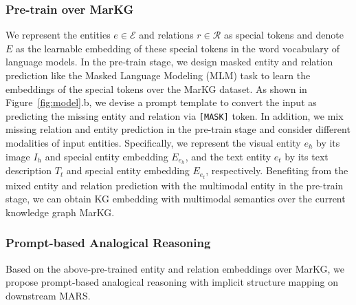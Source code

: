\documentclass{article} \usepackage{iclr2023_conference,times}
\newcommand{\data}{MARS}
\newcommand{\kg}{MarKG}
\begin{document}
\subsubsection{Pre-train over MarKG}
\label{sec:pre-train}
We represent the entities $e \in \mathcal{E}$ and relations $r \in \mathcal{R}$ as special tokens and denote $E$ as the learnable embedding of these special tokens in the word vocabulary of language models.
In the pre-train stage, we design masked entity and relation prediction like the Masked Language Modeling (MLM) task to learn the embeddings of the special tokens over the {\kg} dataset.
As shown in Figure~\ref{fig:model}.b, we devise a prompt template to convert the input as predicting the missing entity and relation via \texttt{[MASK]} token.
In addition, we mix missing relation and entity prediction in the pre-train stage and consider different modalities of input entities.
Specifically, we represent the visual entity $e_h$ by its image $I_h$ and special entity embedding $E_{e_h}$, and the text entity $e_t$ by its text description $T_t$ and special entity embedding  $E_{e_t}$, respectively. 
Benefiting from the mixed entity and relation prediction with the multimodal entity in the pre-train stage, we can obtain KG embedding with multimodal semantics over the current knowledge graph \kg.

\subsubsection{Prompt-based Analogical Reasoning}

Based on the above-pre-trained entity and relation embeddings over \kg, we propose prompt-based analogical reasoning with implicit structure mapping on downstream \data. 
\end{document}
